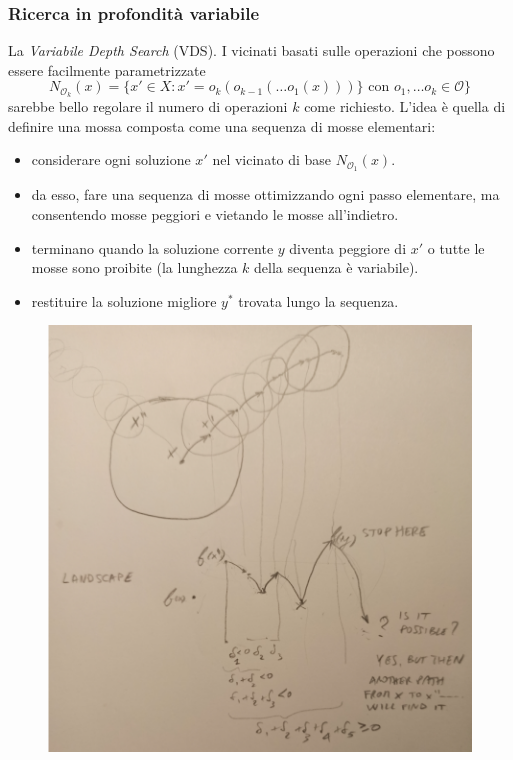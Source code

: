 \documentclass{article}
\begin{document}
\subsubsection{Ricerca in profondità variabile}
La \textit{Variabile Depth Search} (VDS). I vicinati basati sulle operazioni che possono essere
facilmente parametrizzate
$$N_{\mathcal{O}_k}(x)=\{x'\in X:x'=o_k(o_{k-1}(\dots o_1(x)))\}\text{ con }o_1,\dots o_k\in\mathcal{O}\}$$
sarebbe bello regolare il numero di operazioni $k$ come richiesto. L'idea è quella di definire una mossa
composta come una sequenza di mosse elementari:
\begin{itemize}
    \item considerare ogni soluzione $x'$ nel vicinato di base $N_{\mathcal{O}_1}(x)$.
    \item da esso, fare una sequenza di mosse ottimizzando ogni passo elementare,
    ma consentendo mosse peggiori e vietando le mosse all'indietro.
    \item terminano quando la soluzione corrente $y$ diventa peggiore di $x'$ o
    tutte le mosse sono proibite (la lunghezza $k$ della sequenza è variabile).
    \item restituire la soluzione migliore $y^*$ trovata lungo la sequenza.
\end{itemize}
\begin{figure}[H]
    \centering
    \includegraphics[scale=0.6]{images/VRP pox.png}
\end{figure}
\end{document}
